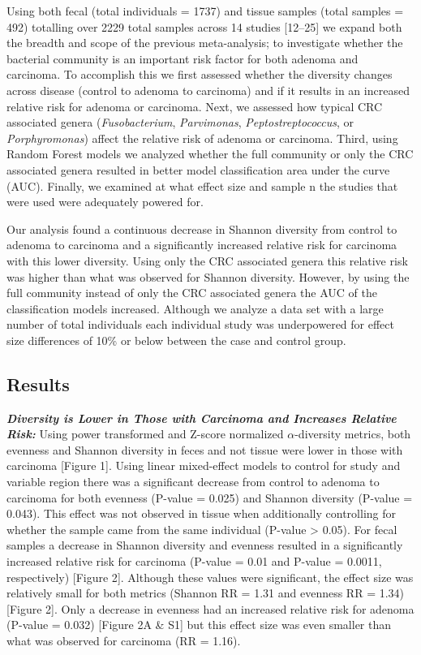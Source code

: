 \documentclass[12pt,]{article}
\begin{document}
Using both fecal (total individuals = 1737) and tissue samples (total
samples = 492) totalling over 2229 total samples across 14 studies
{[}12--25{]} we expand both the breadth and scope of the previous
meta-analysis; to investigate whether the bacterial community is an
important risk factor for both adenoma and carcinoma. To accomplish this
we first assessed whether the diversity changes across disease (control
to adenoma to carcinoma) and if it results in an increased relative risk
for adenoma or carcinoma. Next, we assessed how typical CRC associated
genera (\emph{Fusobacterium}, \emph{Parvimonas},
\emph{Peptostreptococcus}, or \emph{Porphyromonas}) affect the relative
risk of adenoma or carcinoma. Third, using Random Forest models we
analyzed whether the full community or only the CRC associated genera
resulted in better model classification area under the curve (AUC).
Finally, we examined at what effect size and sample n the studies that
were used were adequately powered for.

Our analysis found a continuous decrease in Shannon diversity from
control to adenoma to carcinoma and a significantly increased relative
risk for carcinoma with this lower diversity. Using only the CRC
associated genera this relative risk was higher than what was observed
for Shannon diversity. However, by using the full community instead of
only the CRC associated genera the AUC of the classification models
increased. Although we analyze a data set with a large number of total
individuals each individual study was underpowered for effect size
differences of 10\% or below between the case and control group.

\newpage

\subsection{Results}\label{results}

\textbf{\emph{Diversity is Lower in Those with Carcinoma and Increases
Relative Risk:}} Using power transformed and Z-score normalized
\(\alpha\)-diversity metrics, both evenness and Shannon diversity in
feces and not tissue were lower in those with carcinoma {[}Figure 1{]}.
Using linear mixed-effect models to control for study and variable
region there was a significant decrease from control to adenoma to
carcinoma for both evenness (P-value = 0.025) and Shannon diversity
(P-value = 0.043). This effect was not observed in tissue when
additionally controlling for whether the sample came from the same
individual (P-value \textgreater{} 0.05). For fecal samples a decrease
in Shannon diversity and evenness resulted in a significantly increased
relative risk for carcinoma (P-value = 0.01 and P-value = 0.0011,
respectively) {[}Figure 2{]}. Although these values were significant,
the effect size was relatively small for both metrics (Shannon RR = 1.31
and evenness RR = 1.34) {[}Figure 2{]}. Only a decrease in evenness had
an increased relative risk for adenoma (P-value = 0.032) {[}Figure 2A \&
S1{]} but this effect size was even smaller than what was observed for
carcinoma (RR = 1.16).
\end{document}
